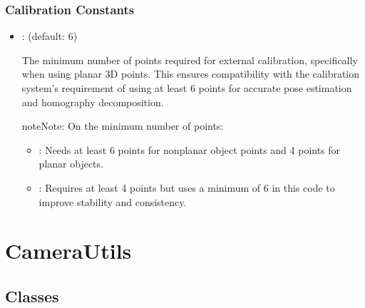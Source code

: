 \documentclass[letterpaper,10pt,english]{sphinxmanual}
\begin{document}
\subsection{Calibration Constants}
\label{\detokenize{conf:calibration-constants}}\begin{itemize}
\item {} 
\sphinxAtStartPar
{}:  (default: 6)

\sphinxAtStartPar
The minimum number of points required for external calibration, specifically when using planar 3D points. This ensures compatibility with the calibration system’s requirement of using at least 6 points for accurate pose estimation and homography decomposition.

\begin{sphinxadmonition}{note}{Note:}
\sphinxAtStartPar
On the minimum number of points:
\begin{itemize}
\item {} 
\sphinxAtStartPar
{}: Needs at least 6 points for non\sphinxhyphen{}planar object points and 4 points for planar objects.

\item {} 
\sphinxAtStartPar
{}: Requires at least 4 points but uses a minimum of 6 in this code to improve stability and consistency.

\end{itemize}
\end{sphinxadmonition}

\end{itemize}

\sphinxstepscope


\chapter{CameraUtils}
\label{\detokenize{CameraUtils:camerautils}}\label{\detokenize{CameraUtils:docs}}\label{\detokenize{CameraUtils::doc}}

\section{Classes}
\label{\detokenize{CameraUtils:classes}}
\end{document}
